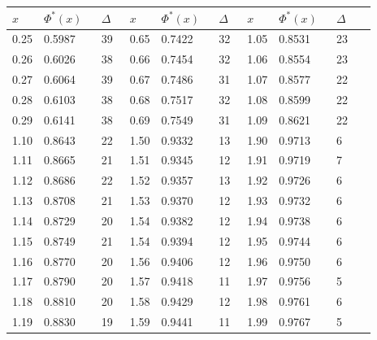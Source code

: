 \documentclass[russian, 12pt, fleqn]{article}
\begin{document}
\begin{tabular}[b]{ | l | l | l || l | l | l || l | l | l | l |   }
\hline
$x\ \ \ \ \ $&$\Phi^*(x)\ \ \ $&$\Delta\ \ \ $&$x\ \ \ \ \ $&$\Phi^*(x)\ \ \ $&$\Delta\ \ \ $&$x\ \ \ \ \ $&$\Phi^*(x)\ \ \ $&$\Delta\ \ \ $\\
\hline
0.25&0.5987&39&0.65&0.7422&32&1.05&0.8531&23\\%
0.26&0.6026&38&0.66&0.7454&32&1.06&0.8554&23\\%
0.27&0.6064&39&0.67&0.7486&31&1.07&0.8577&22\\%
0.28&0.6103&38&0.68&0.7517&32&1.08&0.8599&22\\%
0.29&0.6141&38&0.69&0.7549&31&1.09&0.8621&22\\%
\hline
1.10&0.8643&22&1.50&0.9332&13&1.90&0.9713&6\\%
1.11&0.8665&21&1.51&0.9345&12&1.91&0.9719&7\\%
1.12&0.8686&22&1.52&0.9357&13&1.92&0.9726&6\\%
1.13&0.8708&21&1.53&0.9370&12&1.93&0.9732&6\\%
1.14&0.8729&20&1.54&0.9382&12&1.94&0.9738&6\\%
 
1.15&0.8749&21&1.54&0.9394&12&1.95&0.9744&6\\%
1.16&0.8770&20&1.56&0.9406&12&1.96&0.9750&6\\%
1.17&0.8790&20&1.57&0.9418&11&1.97&0.9756&5\\%
1.18&0.8810&20&1.58&0.9429&12&1.98&0.9761&6\\%
1.19&0.8830&19&1.59&0.9441&11&1.99&0.9767&5\\%
\hline
\end{tabular}\\
\newpage
\noindent 
\end{document}
